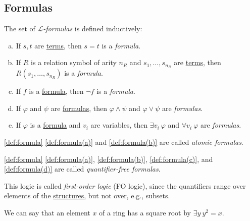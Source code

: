 \subsection{Formulas}
\begin{definition}[Formula]\label{def:formula}
	The set of \emph{\(\mathcal{L} \)-formulas} is defined inductively:
	\begin{enumerate}[(a)]
		\item\label{def:formula(a)} If \(s, t\) are \hyperref[def:term]{terms}, then \(s=t\) is a \emph{formula}.
		\item\label{def:formula(b)} If \(R\) is a relation symbol of arity \(n_R\) and \(s_1, \ldots , s_{n_R}\) are \hyperref[def:term]{terms}, then \(R(s_1, \ldots , s_{n_R})\) is a \emph{formula}.
		\item\label{def:formula(c)} If \(f\) is a \hyperref[def:formula]{formula}, then \(\lnot f\) is a \emph{formula}.
		\item\label{def:formula(d)} If \(\varphi\) and \(\psi\) are \hyperref[def:formula]{formulas}, then \(\varphi \land \psi \) and \(\varphi \lor \psi \) are \emph{formulas}.
		\item\label{def:formula(e)} If \(\varphi \) is a \hyperref[def:formula]{formula} and \(v_i\) are variables, then \(\exists v_i \ \varphi \) and \(\forall v_i \ \varphi \) are \emph{formulas}.
	\end{enumerate}
\end{definition}

\begin{notation}\label{not:atomic-formula}
	\autoref{def:formula} \autoref{def:formula(a)} and \autoref{def:formula(b)} are called \emph{atomic formulas}.
\end{notation}

\begin{notation}\label{not:quantifier-free-formula}
	\autoref{def:formula} \autoref{def:formula(a)}, \autoref{def:formula(b)}, \autoref{def:formula(c)}, and \autoref{def:formula(d)} are called \emph{quantifier-free formulas}.
\end{notation}

This logic is called \emph{first-order logic} (FO logic), since the quantifiers range over elements of the \hyperref[def:structure]{structures}, but not over, e.g., subsets.

\begin{eg}
	We can say that an element \(x\) of a ring has a square root by \(\exists y\ y^2 = x\).
\end{eg}

